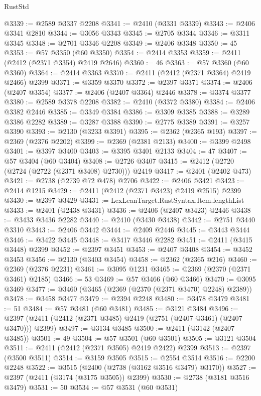 \begin{lexlean}{RustStd}
\begin{coremodule}
@3339 := @2589 @3337 @2208
@3341 := @2410 (@3331 @3339)
@3343 := @2406 @3341 @2810
@3344 := @3056 @3343
@3345 := @2705 @3344
@3346 := @3311 @3345
@3348 := @2701 @3346 @2208
@3349 := @2406 @3348
@3350 := 45
@3353 := @57 @3350 (@60 @3350)
@3354 := @2414 @3353
@3359 := @2411 (@2412 (@2371 @3354) @2419 @2646)
@3360 := 46
@3363 := @57 @3360 (@60 @3360)
@3364 := @2414 @3363
@3370 := @2411 (@2412 (@2371 @3364) @2419 @2466) @2399
@3371 := @3359 @3370
@3372 := @2397 @3371
@3374 := @2406 (@2407 @3354)
@3377 := @2406 (@2407 @3364) @2446
@3378 := @3374 @3377
@3380 := @2589 @3378 @2208
@3382 := @2410 (@3372 @3380)
@3384 := @2406 @3382 @2446
@3385 := @3349 @3384
@3386 := @3309 @3385
@3388 := @3289 @3386 @2282
@3389 := @3287 @3388
@3390 := @2775 @3389
@3391 := @3257 @3390
@3393 := @2130 (@3233 @3391)
@3395 := @2362 (@2365 @193)
@3397 := @2369 (@2376 @2202)
@3399 := @2369 (@2381 @2133)
@3400 := @3399 @2498
@3401 := @3397 @3400
@3403 := @3395 @3401 @2133
@3404 := 47
@3407 := @57 @3404 (@60 @3404)
@3408 := @2726 @3407
@3415 := @2412 (@2720 (@2724 (@2722 (@2371 @3408) @2730))) @2419
@3417 := @2401 (@2402 @473)
@3421 := @2738 (@2739 @72 @478) @2706
@3422 := @2406 @3421
@3423 := @2414 @1215
@3429 := @2411 (@2412 (@2371 @3423) @2419 @2515) @2399
@3430 := @2397 @3429
@3431 := LexLeanTarget.RustSyntax.Item.lengthList
@3433 := @2401 (@2438 @3431)
@3436 := @2406 (@2407 @3423) @2446
@3438 := @3433 @3436 @2282
@3440 := @2410 (@3430 @3438)
@3442 := @2751 @3440 @3310
@3443 := @2406 @3442
@3444 := @2409 @2446
@3445 := @3443 @3444
@3446 := @3422 @3445
@3448 := @3417 @3446 @2282
@3451 := @2411 (@3415 @3448) @2399
@3452 := @2397 @3451
@3453 := @2407 @3408
@3454 := @3452 @3453
@3456 := @2130 (@3403 @3454)
@3458 := @2362 (@2365 @216)
@3460 := @2369 (@2376 @2231)
@3461 := @3095 @1231
@3465 := @2369 (@2370 (@2371 @3461) @2185)
@3466 := 53
@3469 := @57 @3466 (@60 @3466)
@3470 := @3095 @3469
@3477 := @3460 (@3465 (@2369 (@2370 (@2371 @3470) @2248) @2389))
@3478 := @3458 @3477
@3479 := @2394 @2248
@3480 := @3478 @3479
@3481 := 51
@3484 := @57 @3481 (@60 @3481)
@3485 := @3121 @3484
@3496 := @2397 (@2411 (@2412 (@2371 @3485) @2419 (@2751 (@2407 @3461) (@2407 @3470))) @2399)
@3497 := @3134 @3485
@3500 := @2411 (@3142 (@2407 @3485))
@3501 := 49
@3504 := @57 @3501 (@60 @3501)
@3505 := @3121 @3504
@3511 := @2411 (@2412 (@2371 @3505) @2419 @2422) @2399
@3513 := @2397 (@3500 @3511)
@3514 := @3159 @3505
@3515 := @2554 @3514
@3516 := @2200 @2248
@3522 := @3515 (@2400 (@2738 (@3162 @3516 @3479) @3170))
@3527 := @2397 (@2411 (@3174 (@3175 @3505)) @2399)
@3530 := @2738 (@3181 @3516 @3479)
@3531 := 50
@3534 := @57 @3531 (@60 @3531)

\end{coremodule}
\end{lexlean}
